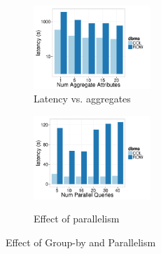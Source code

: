 \begin{figure}[h]
	\centering
	\vspace*{-10pt}
	\begin{subfigure}{0.48\linewidth}
		\centering
		\includegraphics[width=4.4cm] {Images/multi_agg.pdf}
		\vspace{-15pt}
		\caption{Latency vs. aggregates}
		\label{fig:multi_agg}
	\end{subfigure}
	\begin{subfigure}{0.48\linewidth}
		\centering
		\includegraphics[width=4.4cm] {Images/parallel_noop.pdf}\
		\vspace{-15pt}
		\caption{Effect of parallelism}
		\label{fig:parallelism}
	\end{subfigure}
	\vspace{-10pt}
	\caption{Effect of Group-by and Parallelism}
\end{figure}


